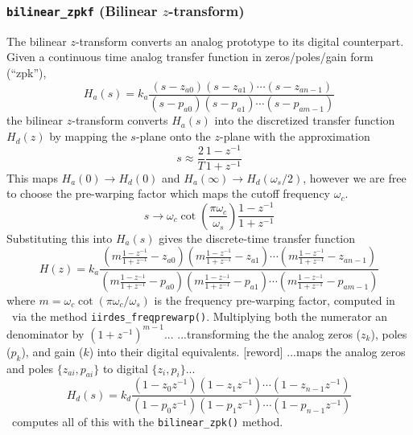 \subsubsection{{\tt bilinear\_zpkf} (Bilinear $z$-transform)}
\label{module:filter:iirdes:bilinear}
The bilinear $z$-transform converts an analog prototype to its digital
counterpart.
Given a continuous time analog transfer function in zeros/poles/gain form
(``zpk''),
\[
    H_a(s) = k_a
            \frac{
                (s-z_{a0})(s-z_{a1})\cdots(s-z_{an-1})
            }{
                (s-p_{a0})(s-p_{a1})\cdots(s-p_{am-1})
            }
\]
the bilinear $z$-transform converts $H_a(s)$ into the discretized transfer
function $H_d(z)$ by mapping the $s$-plane onto the $z$-plane with the
approximation
\[
    s \approx \frac{2}{T}
              \frac{1-z^{-1}}{1 + z^{-1}}
\]
This maps $H_a(0) \rightarrow H_d(0)$ and
$H_a(\infty) \rightarrow H_d(\omega_s/2)$, however we are free to choose the
pre-warping factor which maps the cutoff frequency $\omega_c$.
\[
    s \rightarrow \omega_c
                  \cot\left(\frac{\pi \omega_c}{\omega_s}\right)
                  \frac{1-z^{-1}}{1+z^{-1}}
\]
Substituting this into $H_a(s)$ gives the discrete-time transfer function
\[
    H(z) = k_a \frac{
            \left(m\frac{1-z^{-1}}{1+z^{-1}}-z_{a0}\right)
            \left(m\frac{1-z^{-1}}{1+z^{-1}}-z_{a1}\right)
            \cdots
            \left(m\frac{1-z^{-1}}{1+z^{-1}}-z_{an-1}\right)
           }{
            \left(m\frac{1-z^{-1}}{1+z^{-1}}-p_{a0}\right)
            \left(m\frac{1-z^{-1}}{1+z^{-1}}-p_{a1}\right)
            \cdots
            \left(m\frac{1-z^{-1}}{1+z^{-1}}-p_{am-1}\right)
           }
\]
where $m=\omega_c \cot\left(\pi \omega_c / \omega_s\right)$ is the
frequency pre-warping factor, computed in \liquid\ via the method
{\tt iirdes\_freqprewarp()}.
Multiplying both the numerator an denominator by $(1+z^{-1})^{m-1}$...
...transforming the the analog zeros ($z_k$), poles ($p_k$), and gain ($k$) into
their digital equivalents. [reword]
...maps the analog zeros and poles $\{z_{ai},p_{ai}\}$
to digital $\{z_{i},p_{i}\}$...
\[
    H_d(s) = k_d
            \frac{
                (1-z_{0}z^{-1})(1-z_{1}z^{-1})\cdots(1-z_{n-1}z^{-1})
            }{
                (1-p_{0}z^{-1})(1-p_{1}z^{-1})\cdots(1-p_{n-1}z^{-1})
            }
\]
%
\liquid\ computes all of this with the {\tt bilinear\_zpk()} method.

